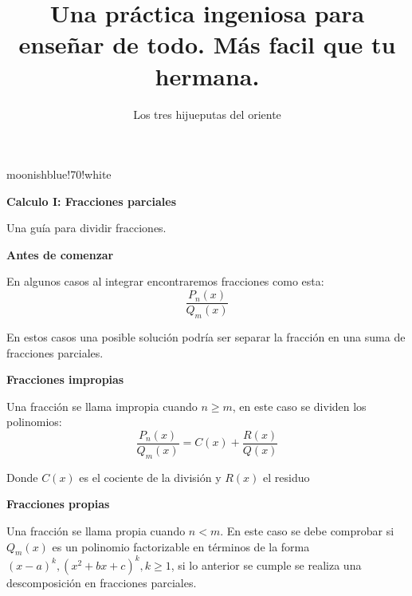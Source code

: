 \documentclass{article}
\title{Una práctica ingeniosa para enseñar de todo. Más facil que tu hermana.}
\author{Los tres hijueputas del oriente}
\newenvironment{formula-box}{
	\begin{tcolorbox}[
		colframe=black, %
		colback=white, %
		arc=1mm, %
		boxrule=1pt, %
		left=2mm, %
		right=2mm, %
		top=2mm, %
		bottom=2mm, %
		]
	}{
	\end{tcolorbox}
}
\newenvironment{title-box}[1]{
	\begin{tcolorbox}[
		colframe=white, %
		colback=white, %
		arc=1mm, %
		left=2mm, %
		right=2mm, %
		top=2mm, %
		bottom=2mm, %
		borderline={0.5mm}{0mm}{#1,dashed},
		enhanced,
		boxrule=0.5mm,
		]
	}{
	\end{tcolorbox}
}
\begin{document}
	
	
	\begin{multicols}{2}
		\begin{title-box}{moonishblue!70!white}
			{\raggedright \large \textbf{Calculo I: Fracciones parciales} \par}
			
			\vspace{2mm}
			
			\begin{title-sign}\end{title-sign}
			
			\vspace{5mm}
			
			 Una guía para dividir fracciones. 
		\end{title-box}
		
		\vfill
		
		\begin{formula-box}
			{\raggedright \large \textbf{Antes de comenzar} \par}
			
			En algunos casos al integrar encontraremos fracciones como esta:
			\[
			\frac{P_n(x)}{Q_m(x)}
			\]
			
			En estos casos una posible solución podría ser separar la fracción en una suma de fracciones parciales.
		\end{formula-box}
		
		\begin{formula-box}
			{\raggedright \large \textbf{Fracciones impropias} \par}
			
			Una fracción se llama impropia cuando $n \geq m$, en este caso se dividen los polinomios:
			\[
			\frac{P_n(x)}{Q_m(x)} = C(x) + \frac{R(x)}{Q(x)}
			\]
			
			Donde $C(x)$ es el cociente de la división y $R(x)$ el residuo
		\end{formula-box}
		
		\begin{formula-box}
			{\raggedright \large \textbf{Fracciones propias} \par}
			
			Una fracción se llama propia cuando $n < m$. En este caso se debe comprobar si $Q_m(x)$ es un polinomio factorizable en términos de la forma $(x-a)^k, (x^2+bx+c)^k, k \geq 1$, si lo anterior se cumple se realiza una descomposición en fracciones parciales.
		\end{formula-box}
		

\end{multicols}
\end{document}
